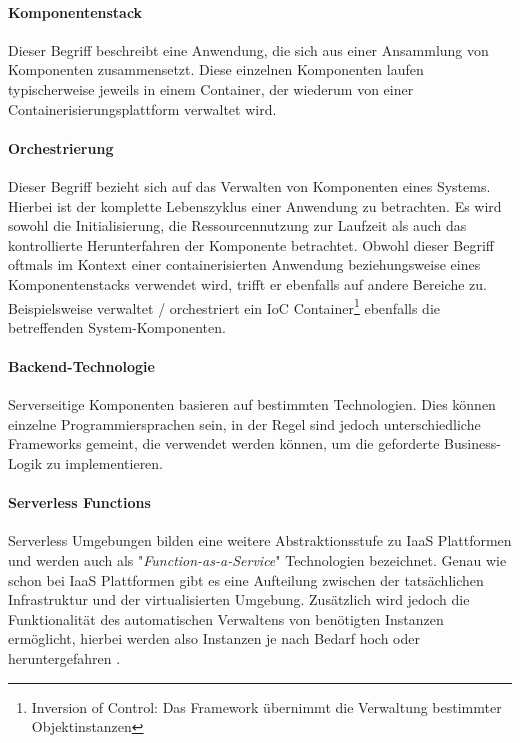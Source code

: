 \paragraph{Komponentenstack}
Dieser Begriff beschreibt eine Anwendung, die sich aus einer Ansammlung von Komponenten zusammensetzt. Diese einzelnen Komponenten laufen typischerweise jeweils in einem Container, der wiederum von einer Containerisierungsplattform verwaltet wird.

\paragraph{Orchestrierung}
Dieser Begriff bezieht sich auf das Verwalten von Komponenten eines Systems. Hierbei ist der komplette Lebenszyklus einer Anwendung zu betrachten. Es wird sowohl die Initialisierung, die Ressourcennutzung zur Laufzeit als auch das kontrollierte Herunterfahren der Komponente betrachtet. Obwohl dieser Begriff oftmals im Kontext einer containerisierten Anwendung beziehungsweise eines Komponentenstacks verwendet wird, trifft er ebenfalls auf andere Bereiche zu. Beispielsweise verwaltet / orchestriert ein IoC Container\footnote{Inversion of Control: Das Framework übernimmt die Verwaltung bestimmter Objektinstanzen} ebenfalls die betreffenden System-Komponenten.

\paragraph{Backend-Technologie}
Serverseitige Komponenten basieren auf bestimmten Technologien. Dies können einzelne Programmiersprachen sein, in der Regel sind jedoch unterschiedliche Frameworks gemeint, die verwendet werden können, um die geforderte Business-Logik zu implementieren.

\paragraph{Serverless Functions}
Serverless Umgebungen bilden eine weitere Abstraktionsstufe zu IaaS Plattformen und werden auch als "\emph{Function-as-a-Service}" Technologien bezeichnet. Genau wie schon bei IaaS Plattformen gibt es eine Aufteilung zwischen der tatsächlichen Infrastruktur und der virtualisierten Umgebung. Zusätzlich wird jedoch die Funktionalität des automatischen Verwaltens von benötigten Instanzen ermöglicht, hierbei werden also Instanzen je nach Bedarf hoch oder heruntergefahren \cite[Seite~70 ff.]{continuous-delivery}.

